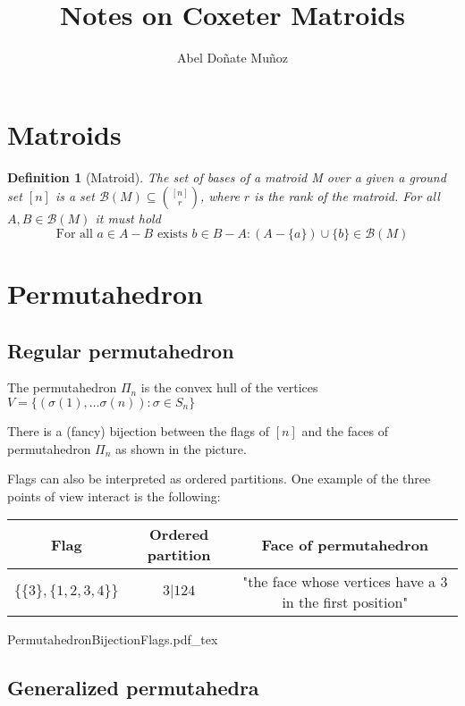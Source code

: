 \documentclass[leqno]{article}
\title{Notes on Coxeter Matroids}
\author{Abel Doñate Muñoz}
\date{}
\numberwithin{equation}{section}
\numberwithin{theorem}{section}
\newtheorem{definition}[theorem]{Definition}
\newcommand{\incfig}[1]{%
\center
\def\svgwidth{0.9\columnwidth}
{#1.pdf_tex}
}
\begin{document}
\maketitle
\tableofcontents
\newpage

\section{Matroids}
\begin{definition}[Matroid]
The set of bases of a matroid M over a given a ground set $[n]$ is a set $\mathcal{B}(M)\subseteq \binom{[n]}{r}$, where $r$ is the rank of the matroid. For all  $A, B \in \mathcal{B}(M)$ it must hold
  \[ \text{For all } a\in A-B \text{ exists } b\in B-A : (A-\{a\})\cup \{b\}\in \mathcal{B}(M)\]
\end{definition}

\section{Permutahedron}
\subsection{Regular permutahedron}
The permutahedron $\Pi_n$ is the convex hull of the vertices $V = \{(\sigma(1), \ldots \sigma (n)) : \sigma \in S_n \}$

There is a (fancy) bijection between the flags of $[n]$ and the faces of permutahedron $\Pi_n$ as shown in the picture.

Flags can also be interpreted as ordered partitions. One example of the three points of view interact is the following: 
\begin{center}
\begin{tabular}{ccc}
Flag 
& 
Ordered partition 
& 
Face of permutahedron 
\\\hline
$\{\{3\},\{1, 2, 3, 4\}\}$
&
$3|124$
&
"the face whose vertices have a 3 in the first position"	
\end{tabular}
\end{center}

\begin{minipage}{\textwidth}
\incfig{PermutahedronBijectionFlags}
\end{minipage}

\subsection{Generalized permutahedra}
\end{document}
